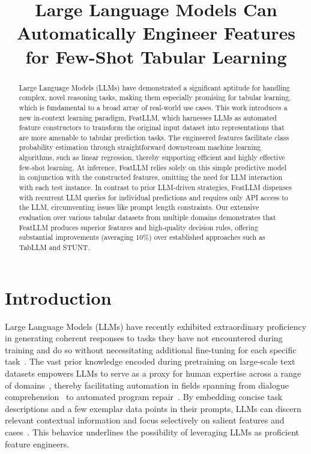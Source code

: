 \title{Large Language Models Can Automatically Engineer Features for Few-Shot Tabular Learning}

\begin{abstract}
Large Language Models (LLMs) have demonstrated a significant aptitude for handling complex, novel reasoning tasks, making them especially promising for tabular learning, which is fundamental to a broad array of real-world use cases. This work introduces a new in-context learning paradigm, \textsf{FeatLLM}, which harnesses LLMs as automated feature constructors to transform the original input dataset into representations that are more amenable to tabular prediction tasks. The engineered features facilitate class probability estimation through straightforward downstream machine learning algorithms, such as linear regression, thereby supporting efficient and highly effective few-shot learning. At inference, \textsf{FeatLLM} relies solely on this simple predictive model in conjunction with the constructed features, omitting the need for LLM interaction with each test instance. In contrast to prior LLM-driven strategies, \textsf{FeatLLM} dispenses with recurrent LLM queries for individual predictions and requires only API access to the LLM, circumventing issues like prompt length constraints. Our extensive evaluation over various tabular datasets from multiple domains demonstrates that \textsf{FeatLLM} produces superior features and high-quality decision rules, offering substantial improvements (averaging 10\%) over established approaches such as TabLLM and STUNT.
\end{abstract}

\section{Introduction}
Large Language Models (LLMs) have recently exhibited extraordinary proficiency in generating coherent responses to tasks they have not encountered during training and do so without necessitating additional fine-tuning for each specific task~\cite{creswell2022selection,imani2023mathprompter,taylor2022galactica}. The vast prior knowledge encoded during pretraining on large-scale text datasets empowers LLMs to serve as a proxy for human expertise across a range of domains~\cite{Genomes2021,singhal2023large,wilcox2003role}, thereby facilitating automation in fields spanning from dialogue comprehension~\cite{finch2023leveraging} to automated program repair~\cite{fan2023automated}. By embedding concise task descriptions and a few exemplar data points in their prompts, LLMs can discern relevant contextual information and focus selectively on salient features and cases~\cite{brown2020language,zhao2023survey}. This behavior underlines the possibility of leveraging LLMs as proficient feature engineers.

